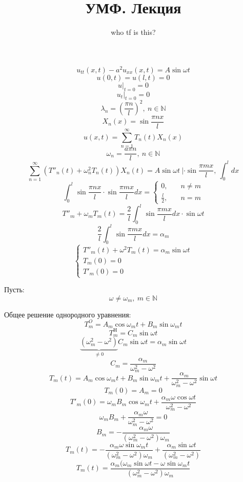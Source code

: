 \documentclass[a4paper]{article}
\begin{document}
\title{УМФ. Лекция}
\author{who tf is this?}
\maketitle

\[
    u_{tt}(x,t) - a^2 u_{xx}(x,t) = A \sin\omega t
\]
\[
    u(0,t) = u(l,t) = 0
\]
\[
    u|_{t=0} = 0
\]
\[
    u_t|_{t=0} = 0
\]
\[
    \lambda_n = \left(\frac{\pi n}{l} \right)^2, \ n \in \mathbb{N}
\]
\[
    X_n(x) = \sin \frac{\pi n x}{l} 
\]
\[
    u(x,t) = \sum_{n=1}^{\infty} T_n(t) X_n(x)
\]
\[
    \omega_{n} = \frac{a \pi n}{l}, \ n \in \mathbb{N}
\]
\[
    \sum_{n=1}^{\infty} (T''_n(t) + \omega_n^2 T_n(t)) X_n(t) = A\sin\omega t\ 
    | \cdot \sin \frac{\pi m x}{l},\ \int_{0}^{l} dx 
\]
\[
    \int_{0}^{l} \sin \frac{\pi n x}{l} \cdot \sin \frac{\pi m x}{l} dx = 
    \begin{cases}
        0, &\quad n \neq m\\
        \frac{l}{2}, &\quad n = m
    \end{cases}
\]
\[
    T''_m + \omega_m T_m(t) = \frac{2}{l} \int_{0}^{l} \sin \frac{\pi m x}{l} dx
    \cdot \sin \omega t
\]
\[
    \frac{2}{l} \int_{0}^{l} \sin \frac{\pi m x}{l} dx = \alpha_m
\]
\[
    \begin{cases}
        T''_m(t) + \omega^2 T_m(t) = \alpha_m \sin \omega t\\
        T_m(0) = 0\\
        T'_m(0) = 0
    \end{cases}
\]

Пусть:
\[
    \omega \neq \omega_m, \ m \in \mathbb{N}
\]

Общее решение однородного уравнения:
\[
    T_m^{O} = A_m \cos \omega_m t + B_m \sin \omega_m t 
\]
\[
    T_m^{\text{Н}} = C_m \sin \omega t
\]
\[
    \underbrace{(\omega_m^2 - \omega^2)}_{\neq 0} C_m \sin \omega t = \alpha_m 
    \sin \omega t
\]
\[
    C_m = \frac{\alpha_m}{\omega_m^2 - \omega^2} 
\]
\[
    T_m(t) = A_m \cos \omega_m t + B_m \sin \omega_m t + \frac{\alpha_m}
    {\omega_m^2 - \omega^2} \sin \omega t
\]
\[
    T_m(0) = A_m = 0
\]
\[
    T'_m(0) = \omega_m B_m \cos \omega_m t + \frac{\alpha_m \omega \cos \omega t}
    {\omega_m^2 - \omega^2} 
\]
\[
    \omega_m B_m + \frac{\alpha_m \omega} {\omega_m^2 - \omega^2} 
    = 0
\]
\[
    B_m = - \frac{\alpha_m \omega}{(\omega_m^2 - \omega^2)\omega_m} 
\]
\[
    T_m(t) = - \frac{\alpha_m \omega \sin \omega_m t}{(\omega_m^2 - \omega^2)\omega_m}
    + \frac{\alpha_m \sin \omega t}{(\omega_m^2 - \omega^2)} 
\]
\[
    T_m(t) = \frac{\alpha_m (\omega_m \sin \omega t - \omega \sin \omega_m t}
    {(\omega_m^2 - \omega^2)\omega_m}
\]
\end{document}

